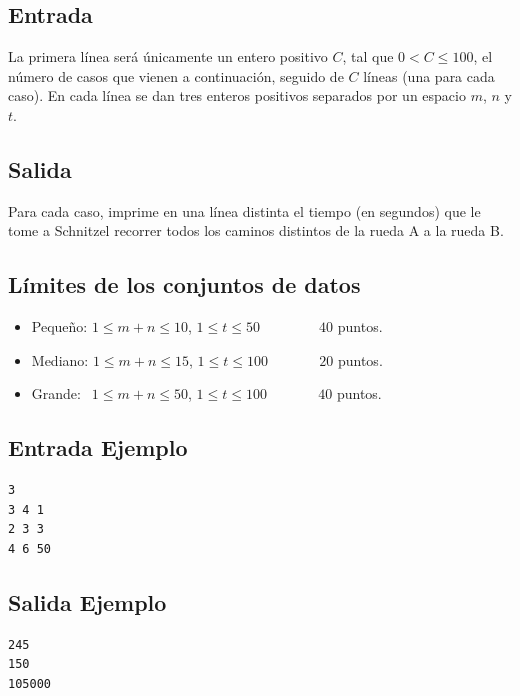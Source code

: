 \subsection*{Entrada}

La primera línea será únicamente un entero positivo $C$, tal que $0 < C \leq 100$, el número de casos que vienen a continuación, seguido de $C$ líneas (una para cada caso). En cada línea se dan tres enteros positivos separados por un espacio $m$, $n$ y $t$.


\subsection*{Salida}

Para cada caso, imprime en una línea distinta el tiempo (en segundos) que le tome a Schnitzel recorrer todos los caminos distintos de la rueda A a la rueda B.


\subsection*{Límites de los conjuntos de datos}

\begin{itemize}
\item Pequeño: $1 \leq m+n \leq 10$, $1 \leq t \leq 50$ $\quad \quad \quad \;\;$ $40$ puntos.
\item Mediano: $1 \leq m+n \leq 15$, $1 \leq t \leq 100$ $\quad \quad \quad$ $20$ puntos.
\item Grande: $\,\; 1 \leq m+n \leq 50$, $1 \leq t \leq 100$ $\quad \quad \quad$ $40$ puntos.
\end{itemize}

\begin{multicols}{2}
\subsection*{Entrada Ejemplo}
\begin{verbatim}
3
3 4 1
2 3 3
4 6 50
\end{verbatim}
\columnbreak
\subsection*{Salida Ejemplo}
\begin{verbatim}
245
150
105000
\end{verbatim}
\end{multicols}


